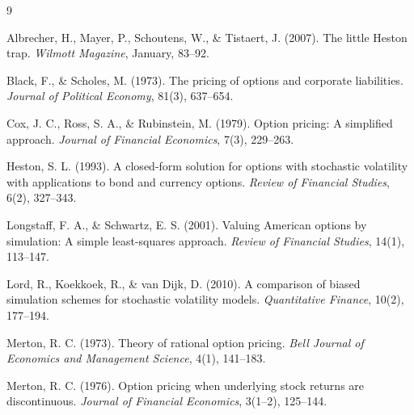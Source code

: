 \documentclass[11pt]{article}
\begin{document}
\begin{thebibliography}{9}

Albrecher, H., Mayer, P., Schoutens, W., \& Tistaert, J. (2007).
The little Heston trap. \emph{Wilmott Magazine}, January, 83--92.

Black, F., \& Scholes, M. (1973). The pricing of options and corporate
liabilities. \emph{Journal of Political Economy}, 81(3), 637--654.

Cox, J. C., Ross, S. A., \& Rubinstein, M. (1979). Option pricing: A simplified
approach. \emph{Journal of Financial Economics}, 7(3), 229--263.

Heston, S. L. (1993). A closed-form solution for options with stochastic
volatility with applications to bond and currency options.
\emph{Review of Financial Studies}, 6(2), 327--343.

Longstaff, F. A., \& Schwartz, E. S. (2001). Valuing American options by
simulation: A simple least-squares approach.
\emph{Review of Financial Studies}, 14(1), 113--147.

Lord, R., Koekkoek, R., \& van Dijk, D. (2010). A comparison of biased simulation
schemes for stochastic volatility models. \emph{Quantitative Finance}, 10(2),
177--194.

Merton, R. C. (1973). Theory of rational option pricing.
\emph{Bell Journal of Economics and Management Science}, 4(1), 141--183.

Merton, R. C. (1976). Option pricing when underlying stock returns are
discontinuous. \emph{Journal of Financial Economics}, 3(1--2), 125--144.

\end{thebibliography}
\end{document}
